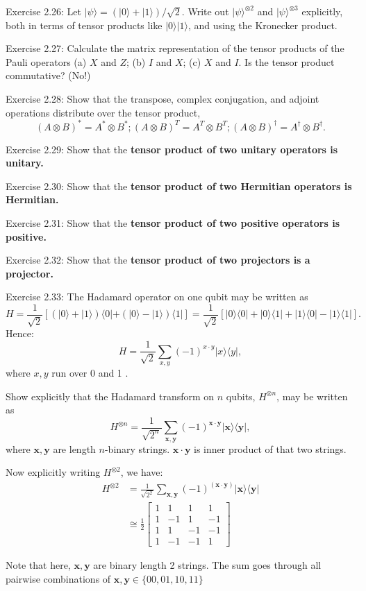Exercise 2.26: Let $|\psi\rangle=(|0\rangle+|1\rangle) / \sqrt{2}$. Write out $|\psi\rangle^{\otimes 2}$ and $|\psi\rangle^{\otimes 3}$ explicitly, both in terms of tensor products like $|0\rangle|1\rangle$, and using the Kronecker product.

Exercise 2.27: Calculate the matrix representation of the tensor products of the Pauli operators (a) $X$ and $Z$; (b) $I$ and $X$; (c) $X$ and $I$. Is the tensor product commutative? (No!)

Exercise 2.28: Show that the transpose, complex conjugation, and adjoint operations distribute over the tensor product,
$$
(A \otimes B)^{*}=A^{*} \otimes B^{*} ;(A \otimes B)^{T}=A^{T} \otimes B^{T} ;(A \otimes B)^{\dagger}=A^{\dagger} \otimes B^{\dagger} .
$$

Exercise 2.29: Show that the \textbf{tensor product of two unitary operators is unitary.}

Exercise 2.30: Show that the\textbf{ tensor product of two Hermitian operators is Hermitian.}

Exercise 2.31: Show that the\textbf{ tensor product of two positive operators is positive.}

Exercise 2.32: Show that the \textbf{tensor product of two projectors is a projector.}




Exercise 2.33: The Hadamard operator on one qubit may be written as
$$
H
=\frac{1}{\sqrt{2}}[(|0\rangle+|1\rangle)\langle 0|+(|0\rangle-|1\rangle)\langle 1|]
=\frac{1}{\sqrt{2}}[|0\rangle\langle 0|+| 0\rangle\langle 1|+| 1\rangle\langle 0|-| 1\rangle\langle 1|].
$$
Hence:
$$
H=\frac{1}{\sqrt{2}} \sum_{x, y}(-1)^{x \cdot y}|x\rangle\langle y|,
$$
where $x, y$ run over 0 and 1 .

Show explicitly that the Hadamard transform on $n$ qubits, $H^{\otimes n}$, may be written as
$$
H^{\otimes n}
=\frac{1}{\sqrt{2^n}} \sum_{\mathbf{x}, \mathbf{y}}(-1)^{\mathbf{x} \cdot \mathbf{y}}|\mathbf{x}\rangle\langle\mathbf{y}|,
$$
where $\mathbf{x}, \mathbf{y}$ are length $n$-binary strings. $\mathbf{x} \cdot \mathbf{y}$ is inner product of that two strings.

Now explicitly writing $H^{\otimes 2}$, we have:
$$
\begin{aligned}
H^{\otimes 2} & =\frac{1}{\sqrt{2^2}} \sum_{\mathbf{x}, \mathbf{y}}(-1)^{(\mathbf{x} \cdot \mathbf{y})}|\mathbf{x}\rangle\langle\mathbf{y}| \\
& \cong \frac{1}{2}\left[\begin{array}{cccc}
1 & 1 & 1 & 1 \\
1 & -1 & 1 & -1 \\
1 & 1 & -1 & -1 \\
1 & -1 & -1 & 1
\end{array}\right]
\end{aligned}
$$

Note that here, $\mathbf{x}, \mathbf{y}$ are binary length 2 strings. The sum goes through all pairwise combinations of $\mathbf{x}, \mathbf{y} \in\{00,01,10,11\}$